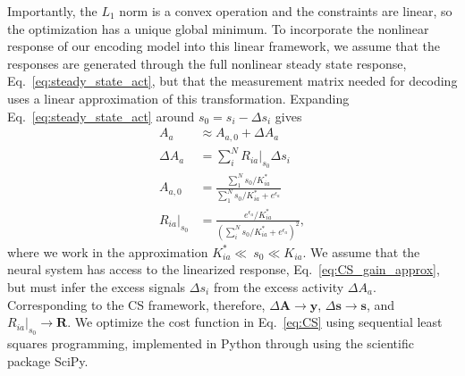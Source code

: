 \documentclass[9pt,twocolumn,twoside,lineno]{pnas-new}
\begin{document}
Importantly, the $L_1$ norm is a convex operation and the constraints are linear, so the optimization has a unique global minimum. To incorporate the nonlinear response of our encoding model into this linear framework, we assume that the responses are generated through the full nonlinear steady state response, Eq.~\ref{eq:steady_state_act}, but that the measurement matrix needed for decoding uses a linear approximation of this transformation.  Expanding Eq.~\ref{eq:steady_state_act} around $s_0 = s_i - \Delta s_i$ gives
\begin{align}
A_a &\approx A_{a, 0} + \Delta A_a \label{eq:CS_act_approx} \\
\Delta A_a &= \sum_i^NR_{ia}\big|_{s_0}\Delta s_i \label{eq:CS_dAct_approx}\\
A_{a, 0} &= \frac{\sum_1^N s_0/K_{ia}^*}{\sum_1^N s_0/K_{ia}^* + e^{\epsilon_a}} \label{eq:CS_act0_approx} \\
R_{ia}\big|_{s_0} &=  \frac{e^{\epsilon_a}/K_{ia}^*}{(\sum_i^Ns_0/K_{ia}^* + e^{\epsilon_a})^2},
\label{eq:CS_gain_approx}
\end{align}
where we work in the approximation $K^*_{ia} \ll~s_0 \ll K_{ia}$. We assume that the neural system has access to the linearized response, Eq.~\ref{eq:CS_gain_approx}, but must infer the excess signals $\Delta s_i$ from the excess activity $\Delta A_a$. Corresponding to the CS framework, therefore, $\Delta \mathbf {A} \rightarrow \mathbf y$, $\Delta \mathbf s \rightarrow \mathbf s$, and $R_{ia}\big|_{s_0} \rightarrow \mathbf R$. We optimize the cost function in Eq.~\ref{eq:CS} using sequential least squares programming, implemented in Python through using the scientific package SciPy.
\end{document}
